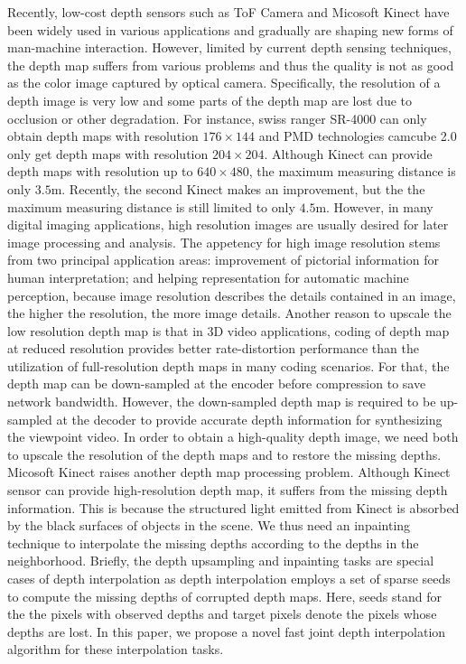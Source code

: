 \documentclass[preprint,10pt,5p,times,twocolumn]{elsarticle}
\begin{document}
Recently, low-cost depth sensors such as ToF Camera and Micosoft Kinect have been widely used in various applications and gradually are shaping new forms of man-machine interaction. However, limited by current depth sensing techniques, the depth map suffers from various problems and thus the quality is not as good as the color image captured by optical camera.
Specifically, the resolution of a depth image is very low and some parts of the depth map are lost due to occlusion or other degradation. For instance, swiss ranger SR-4000 can only obtain depth maps with resolution $176 \times 144$ and PMD technologies camcube 2.0 only get depth maps with resolution $204 \times 204$. Although Kinect can provide depth maps with resolution up to $640 \times 480$,  the maximum measuring distance is only $3.5$m. Recently, the second Kinect makes an improvement, but the the maximum measuring distance is still limited to only $4.5$m.
However, in many digital imaging applications, high resolution images are usually desired for later image processing and analysis. The appetency for high image resolution stems from two principal application areas: improvement of pictorial information for human interpretation; and helping representation for automatic machine perception, because image resolution describes the details contained in an image, the higher the resolution, the more image details. Another reason to upscale the low resolution depth map is that in 3D video applications, coding of depth map at reduced resolution provides better rate-distortion performance than the utilization of full-resolution depth maps in many coding scenarios. For that, the depth map can be down-sampled at the encoder before compression to save network bandwidth. However, the
down-sampled depth map is required to be up-sampled at the decoder to provide accurate depth information for synthesizing the viewpoint video. In order to obtain a high-quality depth image, we need both to upscale the resolution of the depth maps and to restore the missing depths. Micosoft Kinect raises another depth map processing problem.  Although Kinect sensor can provide high-resolution depth map, it suffers from the missing depth information. This is because the structured light emitted from Kinect  is absorbed by the black surfaces of objects in the scene. We thus need an inpainting technique to interpolate the missing depths according to the depths in the neighborhood.
Briefly, the depth upsampling and inpainting tasks are special cases of depth interpolation as depth interpolation employs a set of sparse seeds to compute the missing depths of corrupted depth maps. Here, seeds stand for the the pixels with observed depths and target pixels denote the pixels whose depths are lost. In this paper, we propose a novel fast joint depth interpolation algorithm for these interpolation tasks.
\end{document}

